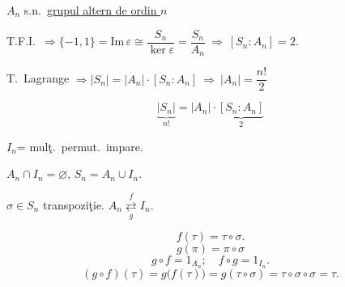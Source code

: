 \documentclass[12pt]{article}
\begin{document}
\noindent $A_n$ s.n.\ \underline{grupul altern de ordin $n$}

\bigskip
\noindent T.F.I.\ $\Rightarrow \{-1,1\} = \text{Im}\,\varepsilon \cong \dfrac{S_n}{\ker\varepsilon} = \dfrac{S_n}{A_n} \ \Rightarrow \ [S_n:A_n]=2.$

\bigskip
\noindent T.\ Lagrange $\Rightarrow |S_n| = |A_n|\cdot[S_n:A_n] \ \Rightarrow \ |A_n| = \dfrac{n!}{2}$

\[
\underbrace{|S_n|}_{n!} = |A_n|\cdot\underbrace{[S_n:A_n]}_{2}
\]

\bigskip
\noindent $I_n$= mulţ.\ permut.\ impare.

\noindent $A_n\cap I_n=\varnothing$, \quad $S_n = A_n\cup I_n$.

\bigskip
\noindent $\sigma\in S_n$ transpoziţie. \qquad $A_n \underset{g}{\overset{f}{\rightleftarrows}} I_n$.

\[
f(\tau) = \tau\circ\sigma.
\]
\[
g(\pi) = \pi\circ\sigma
\]
\[
g\circ f = 1_{A_n}; \quad f\circ g = 1_{I_n}.
\]
\[
(g\circ f)(\tau) = g\big(f(\tau)\big) = g(\tau\circ\sigma) = \tau\circ\sigma\circ\sigma = \tau.
\]
\end{document}
